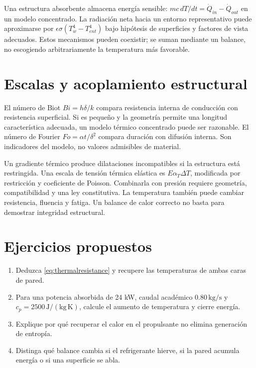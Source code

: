 Una estructura absorbente almacena energía sensible: $mc\,dT/dt=\dot Q_{in}-\dot Q_{out}$ en un modelo concentrado. La radiación neta hacia un entorno representativo puede aproximarse por $\epsilon\sigma(T_w^4-T_{ent}^4)$ bajo hipótesis de superficies y factores de vista adecuados. Estos mecanismos pueden coexistir; se suman mediante un balance, no escogiendo arbitrariamente la temperatura más favorable.\cite{MIT10}
\section{Escalas y acoplamiento estructural}
El número de Biot $Bi=h\delta/k$ compara resistencia interna de conducción con resistencia superficial. Si es pequeño y la geometría permite una longitud característica adecuada, un modelo térmico concentrado puede ser razonable. El número de Fourier $Fo=\alpha t/\delta^2$ compara duración con difusión interna. Son indicadores del modelo, no valores admisibles de material.

Un gradiente térmico produce dilataciones incompatibles si la estructura está restringida. Una escala de tensión térmica elástica es $E\alpha_T\Delta T$, modificada por restricción y coeficiente de Poisson. Combinarla con presión requiere geometría, compatibilidad y una ley constitutiva. La temperatura también puede cambiar resistencia, fluencia y fatiga. Un balance de calor correcto no basta para demostrar integridad estructural.\cite{MIT06}
\section{Ejercicios propuestos}
\begin{enumerate}
\item Deduzca \eqref{eq:thermalresistance} y recupere las temperaturas de ambas caras de pared.
\item Para una potencia absorbida de 24 kW, caudal académico $0.80\,\mathrm{kg/s}$ y $c_p=2500\,\mathrm{J/(kg\,K)}$, calcule el aumento de temperatura y cierre energía.
\item Explique por qué recuperar el calor en el propulsante no elimina generación de entropía.
\item Distinga qué balance cambia si el refrigerante hierve, si la pared acumula energía o si una superficie se abla.
\end{enumerate}
